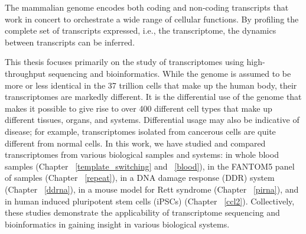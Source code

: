 The mammalian genome encodes both coding and non-coding transcripts that work in concert to orchestrate a wide range of cellular functions. By profiling the complete set of transcripts expressed, i.e., the transcriptome, the dynamics between transcripts can be inferred.

This thesis focuses primarily on the study of transcriptomes using high-throughput sequencing and bioinformatics. While the genome is assumed to be more or less identical in the 37 trillion cells that make up the human body\cite{pmid23829164}, their transcriptomes are markedly different. It is the differential use of the genome that makes it possible to give rise to over 400 different cell types\cite{pmid16790079} that make up different tissues, organs, and systems. Differential usage may also be indicative of disease; for example, transcriptomes isolated from cancerous cells are quite different from normal cells. In this work, we have studied and compared transcriptomes from various biological samples and systems: in whole blood samples (Chapter ~\ref{template_switching} and ~\ref{blood}), in the FANTOM5 panel of samples (Chapter ~\ref{repeat}), in a DNA damage response (DDR) system (Chapter ~\ref{ddrna}), in a mouse model for Rett syndrome (Chapter ~\ref{pirna}), and in human induced pluripotent stem cells (iPSCs) (Chapter ~\ref{ccl2}). Collectively, these studies demonstrate the applicability of transcriptome sequencing and bioinformatics in gaining insight in various biological systems.
